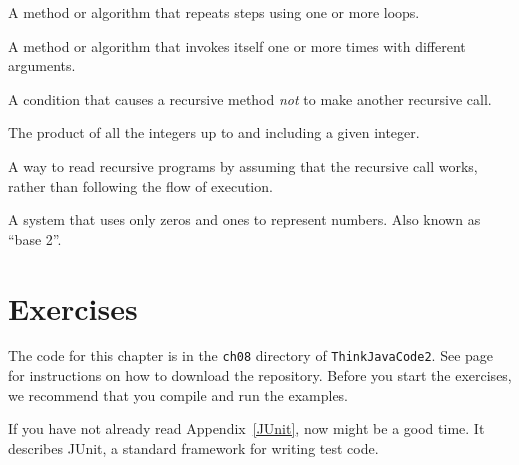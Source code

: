 \begin{description}



A method or algorithm that repeats steps using one or more loops.

A method or algorithm that invokes itself one or more times with different arguments.


A condition that causes a recursive method {\em not} to make another recursive call.


The product of all the integers up to and including a given integer.

A way to read recursive programs by assuming that the recursive call works, rather than following the flow of execution.

A system that uses only zeros and ones to represent numbers.
Also known as ``base 2''.

\end{description}


\section{Exercises}

The code for this chapter is in the {\tt ch08} directory of {\tt ThinkJavaCode2}.
See page~\pageref{code} for instructions on how to download the repository.
Before you start the exercises, we recommend that you compile and run the examples.

If you have not already read Appendix~\ref{JUnit}, now might be a good time.
It describes JUnit, a standard framework for writing test code.


